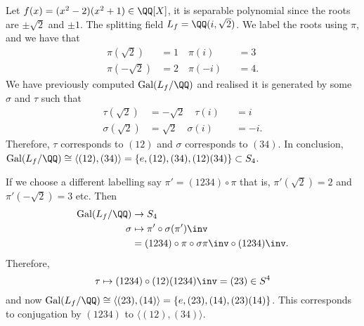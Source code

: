 \documentclass[12pt, a4paper]{article}
\newcommand{\gal}{\text{Gal}}
\begin{document}
\begin{mdexample}
    Let \(f(x)=(x^2-2)(x^2+1) \in \QQ[X]\), it is separable polynomial since the roots are \(\pm\sqrt{2}\) and \(\pm 1\). The splitting field \(L_f = \QQ(i,\sqrt{2})\). We label the roots using \(\pi\), and we have that 
    \[\begin{aligned}
        \pi(\sqrt{2}) & =1 \quad \pi(i) &&=3 \\
        \pi(-\sqrt{2}) &= 2 \quad \pi(-i) &&=4.
    \end{aligned}\]
    We have previously computed \(\gal(L_f/\QQ)\) and realised it is generated by some \(\sigma\) and \(\tau\) such that
    \[\begin{aligned}
        \tau(\sqrt{2}) & =-\sqrt{2} \quad \tau(i) &&=i \\
        \sigma(\sqrt{2}) &= \sqrt{2} \quad \sigma(i) &&=-i.
    \end{aligned}\]
    Therefore, \(\tau\) corresponds to \((12)\) and \(\sigma\) corresponds to \((34)\). In conclusion, \(\gal(L_f/\QQ)\cong \langle (12),(34) \rangle = \left\{ e,(12),(34),(12)(34) \right\} \subset S_4\).
\end{mdexample}

\begin{example}
    If we choose a different labelling say \(\pi'=(1234)\circ\pi\) that is, \(\pi'(\sqrt{2})=2\) and \(\pi'(-\sqrt{2})=3\) etc. Then 
    \[\begin{aligned}
        \gal(L_f/\QQ) &\to S_4 \\
        \sigma &\mapsto \pi'\circ \sigma (\pi')\inv \\
        &= (1234)\circ\pi \circ \sigma \pi\inv \circ (1234)\inv.
    \end{aligned}\]
    Therefore,
    \[\tau \mapsto (1234) \circ (12)(1234)\inv = (23) \in S^4\]
    and now \(\gal(L_f/\QQ) \cong \langle (23),(14)\rangle = \left\{ e,(23),(14),(23)(14) \right\}\). This corresponds to conjugation by \((1234)\) to \(\langle (12),(34) \rangle\).
\end{example}
\end{document}

